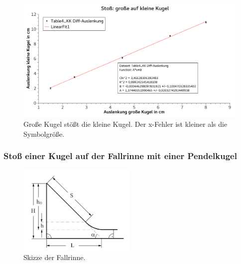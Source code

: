 \documentclass[
	a4paper,
	12pt,
	pagesize,
	ngerman
]{scrartcl}
\begin{document}
	\begin{figure}[htb]
	  \centering
	    \includegraphics[width=1.0\textwidth]{StossGKaufKK}
	  \caption{Große Kugel stößt die kleine Kugel. Der x-Fehler ist kleiner als die Symbolgröße.}
		\label{GraphGKaufKK}
	\end{figure}


	\subsubsection{Stoß einer Kugel auf der Fallrinne mit einer Pendelkugel}

	\begin{figure}[htb]
	  \centering
	    \includegraphics[width=0.5\textwidth]{Skizze}
	  \caption{Skizze der Fallrinne.}
	  \label{Skizze}
	\end{figure}
\end{document}
